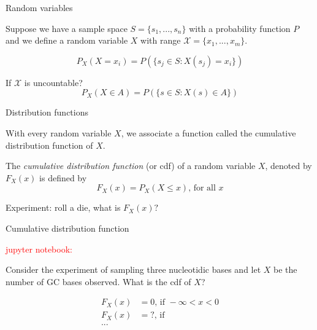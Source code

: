 \documentclass{beamer}
\begin{document}
\begin{frame}{Random variables}

	Suppose we have a sample space $S=\{s_1,...,s_n\}$ with a probability function $P$ and we 
	define a random variable $X$ with range $\mathcal{X}=\{x_1,...,x_m\}$.

	\begin{equation*}
		P_X(X=x_i) =  P(\{s_j \in S : X(s_j)=x_i\} )
	\end{equation*}

	If $\mathcal{X}$ is uncountable?
	\pause
	\begin{equation*}
		P_X(X \in A) =  P(\{s \in S : X(s) \in A\} )
	\end{equation*}

\end{frame}

\begin{frame}{Distribution functions}

With every random variable $X$, we associate a function called the cumulative distribution function of $X$.

	\begin{block}{}
		The \textit{cumulative distribution function} (or cdf) of a random variable $X$, 
		denoted by $F_X(x)$ is defined by
		\begin{equation*}
			F_X(x) = P_X(X \leq x) \text{, for all } x
		\end{equation*}
	\end{block}

	\vskip 1cm

	\small{Experiment: roll a die, what is $F_X(x)?$}

\end{frame}

\begin{frame}{Cumulative distribution function}

	\textcolor{red}{jupyter notebook:}

	Consider the experiment of sampling three nucleotidic bases and let $X$ be the number of GC bases observed.
	What is the cdf of $X$?

	\pause

	\begin{align*}
		F_X(x) &= 0 \text{, if } -\infty < x < 0 \\
		F_X(x) &= ? \text{, if } \\
		...
	\end{align*}

\end{frame}
\end{document}
